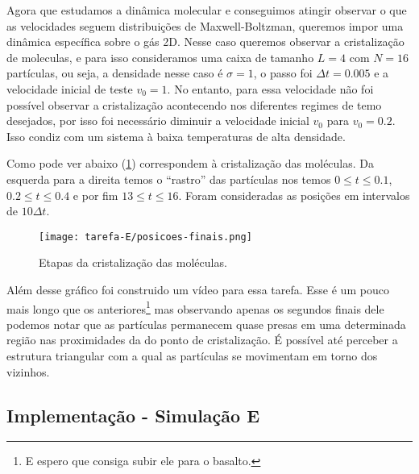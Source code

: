 Agora que estudamos a dinâmica molecular e conseguimos atingir observar o que as velocidades 
seguem distribuições de Maxwell-Boltzman, queremos impor uma dinâmica específica sobre o 
gás 2D. 
Nesse caso queremos observar a cristalização de moleculas, e para isso consideramos uma caixa 
de tamanho $L=4$ com $N = 16$ partículas, ou seja, a densidade nesse caso é $\sigma = 1$, o passo 
foi $\Delta t = 0.005$ e a velocidade inicial de teste $v_0 = 1$. 
No entanto, para essa velocidade não foi possível observar a cristalização acontecendo nos diferentes regimes
de temo desejados, por isso foi necessário diminuir a velocidade inicial $v_0$ para 
$v_0 = 0.2$. Isso condiz com um sistema à baixa temperaturas de alta densidade. 

Como pode ver abaixo (\ref{fig:posicoes-finais-e}) correspondem à cristalização das moléculas. 
Da esquerda para a direita temos o ``rastro'' das partículas nos temos $0 \leq t \leq 0.1$, $0.2 \leq t \leq 0.4$ e 
por fim $13 \leq t \leq 16$. Foram consideradas as posições em intervalos de $ 10 \Delta t$. 

\begin{figure}[h!]
    \centering
    \texttt{[image: tarefa-E/posicoes-finais.png]}
    \caption{Etapas da cristalização das moléculas.}
    \label{fig:posicoes-finais-e}
\end{figure}


Além desse gráfico foi construido um vídeo para essa tarefa. Esse é um pouco mais longo que os anteriores\footnote{E espero que consiga subir ele para o basalto.}
mas observando apenas os segundos finais dele podemos notar que as partículas permanecem quase presas em uma determinada região nas proximidades da 
do ponto de cristalização. É possível até perceber a estrutura triangular com a qual as partículas se movimentam em torno dos vizinhos. 

\subsection*{Implementação - Simulação E}

\clearpage 